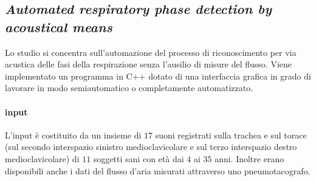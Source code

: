 \begin{frame}
\subsection[Automated respiratory phase detection by acoustical means]{\textit{Automated respiratory phase detection by acoustical means} \cite{DECE}}


  Lo studio \cite{DECE} si concentra sull'automazione del processo di riconoscimento per via acustica delle fasi della respirazione senza l'ausilio di misure del flusso. 
  Viene implementato un programma in C++ dotato di una interfaccia grafica in grado di lavorare in modo semiautomatico o completamente automatizzato.
  \paragraph{input}
    L'input \`e costituito da un insieme di $17$ suoni registrati sulla trachea e sul torace (sul secondo interspazio sinistro medioclavicolare e sul terzo 
    interspazio destro medioclavicolare) di $11$ soggetti sani con et\`a dai $4$ ai $35$ anni. 
    Inoltre erano disponibili anche i dati del flusso d'aria misurati 
    attraverso uno pneumotacografo.

\end{frame}
